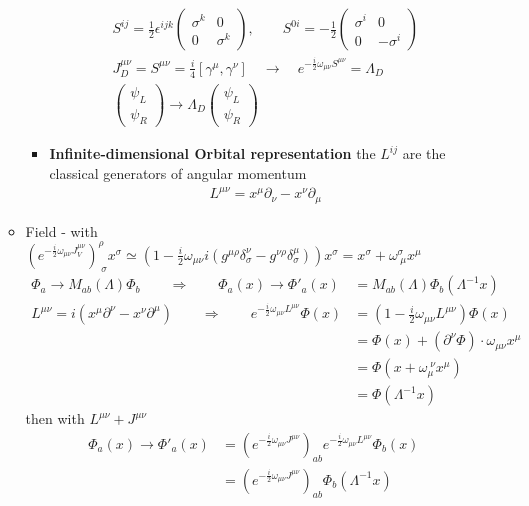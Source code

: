\documentclass[10pt,a4paper]{report}
\theoremstyle{definition}
\begin{document}
\begin{itemize}
\begin{itemize}
\begin{itemize}
\begin{align}
S^{ij}=\frac{1}{2}\epsilon^{ijk}\left(\begin{matrix}
\sigma^k & 0\\
0 & \sigma^k
\end{matrix}
\right),\qquad
S^{0i}=-\frac{1}{2}\left(\begin{matrix}
\sigma^i & 0\\
0 & -\sigma^i
\end{matrix}
\right)\\
J_D^{\mu\nu}=S^{\mu\nu}=\frac{i}{4}[\gamma^\mu,\gamma^\nu]\quad\rightarrow\quad e^{-\frac{i}{2}\omega_{\mu\nu}S^{\mu\nu}}=\Lambda_D\\
\left(\begin{matrix}
\psi_L \\ \psi_R
\end{matrix}
\right)\rightarrow\Lambda_D\left(\begin{matrix}
\psi_L \\ \psi_R
\end{matrix}
\right)
\end{align}
\item {\bf Infinite-dimensional Orbital representation} the $L^{ij}$ are the classical generators of angular momentum 
\begin{align}
L^{\mu\nu}=x^\mu\partial_\nu-x^\nu\partial_\mu
\end{align}
\end{itemize}
\item Field - with $\left(e^{-\frac{i}{2}\omega_{\mu\nu}J_V^{\mu\nu}}\right)^\rho_{\;\sigma}x^\sigma
\simeq\left(1-\frac{i}{2}\omega_{\mu\nu}i(g^{\mu\rho}\delta^\nu_\sigma-g^{\nu\rho}\delta^\mu_\sigma)\right)x^\sigma=x^\sigma+\omega^\sigma_{\;\mu} x^\mu$
\begin{align}
\Phi_a\rightarrow M_{ab}(\Lambda)\Phi_b
\qquad\Rightarrow\qquad
\Phi_a(x)\rightarrow \Phi'_a(x)&=M_{ab}(\Lambda)\Phi_b(\Lambda^{-1}x)\\
L^{\mu\nu}=i(x^\mu\partial^\nu-x^\nu\partial^\mu)
\qquad\Rightarrow\qquad
e^{-\frac{i}{2}\omega_{\mu\nu}L^{\mu\nu}}\Phi(x)
&=\left(1-\frac{i}{2}\omega_{\mu\nu}L^{\mu\nu}\right)\Phi(x)\\
&=\Phi(x)+(\partial^\nu\Phi)\cdot \omega_{\mu\nu}x^\mu\\
&=\Phi(x+\omega_\mu^{\;\nu}x^\mu)\\
&=\Phi(\Lambda^{-1}x)
\end{align}
then with $L^{\mu\nu}+J^{\mu\nu}$
\begin{align}
\Phi_a(x)\rightarrow \Phi'_a(x)
&=\left(e^{-\frac{i}{2}\omega_{\mu\nu}J^{\mu\nu}}\right)_{ab}e^{-\frac{i}{2}\omega_{\mu\nu}L^{\mu\nu}}\Phi_b(x)\\
&=\left(e^{-\frac{i}{2}\omega_{\mu\nu}J^{\mu\nu}}\right)_{ab}\Phi_b(\Lambda^{-1}x)
\end{align}


\end{itemize}
\end{itemize}
\end{document}
